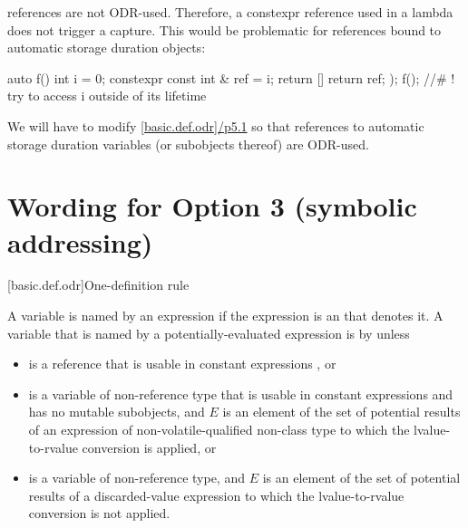 \documentclass{wg21}
\begin{document}
 references are not ODR-used.  Therefore, a constexpr reference used in a lambda does not trigger a capture.
This would be problematic for references bound to automatic storage duration objects:

\begin{colorblock}
auto f() {
    int i = 0;
    constexpr const int & ref = i;
    return [] {
        return ref;
    });
}
f(); //# ! try to access i outside of its lifetime
\end{colorblock}

We will have to modify \href{http://eel.is/c++draft/basic.def.odr#5.1}{[basic.def.odr]/p5.1} so that  references to automatic storage duration variables (or subobjects thereof) are ODR-used.


\section{Wording for Option 3 (symbolic addressing)}

[basic.def.odr]{One-definition rule}%


\label{term.odr.use}%
A variable is named by an expression
if the expression is an  that denotes it.
A variable  that is named by a
potentially-evaluated expression 
is  by  unless
\begin{removedblock}
\begin{itemize}
    \item
     is a reference that is
    usable in constant expressions , or
    \item
     is a variable of non-reference type that is
    usable in constant expressions and has no mutable subobjects, and
    $E$ is an element of the set of potential results of an expression
    of non-volatile-qualified non-class type
    to which the lvalue-to-rvalue conversion  is applied, or
    \item
     is a variable of non-reference type, and
    $E$ is an element of the set of potential results
    of a discarded-value expression 
    to which the lvalue-to-rvalue conversion is not applied.
\end{itemize}
\end{removedblock}
\end{document}
